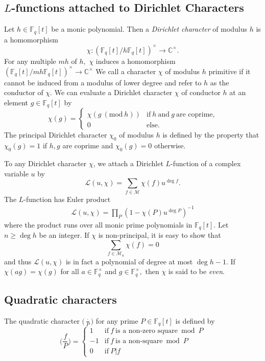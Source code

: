 \documentclass[12pt,reqno]{amsart}
\newcommand{\Mod}[1]{\ (\mathrm{mod}\ #1)}
\newcommand{\BF}{\mathbb{F}}
\newcommand{\CL}{\mathcal{L}}
\newcommand{\CM}{\mathcal{M}}
\begin{document}
\subsection{$L$-functions attached to Dirichlet Characters} Let $h \in \BF_{q}[t]$ be a monic polynomial. Then a \textit{Dirichlet character} of modulus $h$ is a homomorphism 
$$
\chi : ( \BF_{q}[t]/ h \BF_{q}[t])^{\times} \rightarrow \mathbb{C}^{\times}.
$$
For any multiple $m h$ of $h,$ $\chi$ induces a homomorphism $(\BF_{q}[t]/ m h \BF_{q}[t])^{\times} \rightarrow \mathbb{C}^{\times}$
We call a character $\chi$ of modulus $h$ primitive if it cannot be induced from a modulus of lower degree and refer to $h$ as the conductor of $\chi$. We can evaluate a Dirichlet character $\chi$ of
conductor $h$ at an element $g \in \BF_{q}[t]$ by
\[
\chi(g) = \begin{cases} 
\chi ( g \Mod{h}) & \text{if}\ h\ \text{and}\ g\ \text{are coprime,}\\
0 & \text{else.}
\end{cases}
\]
The principal Dirichlet character $\chi_{0}$ of modulus $h$ is defined by the property that $\chi_{0}(g) = 1 $ if $h, g$ are coprime and $\chi_{0}(g)= 0$ otherwise. 

To any Dirichlet character $\chi$, we attach a Dirichlet $L$-function of a complex variable $u$ by
\[
\CL(u,\chi) = \sum_{f \in \CM} \chi(f) u^{\deg f}. 
\]
The $L$-function has Euler product
\begin{align*}
    \CL(u,\chi) = \prod_{P} (1-\chi(P)u^{\deg P})^{-1}
\end{align*}
where the product runs over all monic prime polynomials in $\BF_{q}[t]$. Let $n \geq \deg h$ be an integer. If $\chi$ is non-principal, it is easy to show that %
\[
\sum_{f \in \CM_{n}} \chi(f) = 0 
\]
and thus $\CL(u, \chi)$ is in fact a polynomial of degree at most $\deg h -1.$ If $\chi(ag) = \chi(g)$ for all $a \in \BF_{q}^{\times}$ and $g \in \BF_{q}^{\times},$ then $\chi$ is said to be \textit{even}.


\subsection{Quadratic characters}
The quadratic character $\Big ( \frac{\cdot}{P}\Big)$ for any prime $P \in \BF_{q}[t]$ is defined by
\[
\Big (\frac{f}{P} \Big )= 
\begin{cases} 
1 & \text{if}\ f\ \text{is a non-zero square} \bmod P \\
-1 & \text{if}\ f\ \text{is a non-square} \bmod P  \\
0 & \text{if}\ P | f  
\end{cases}
\]
\end{document}
